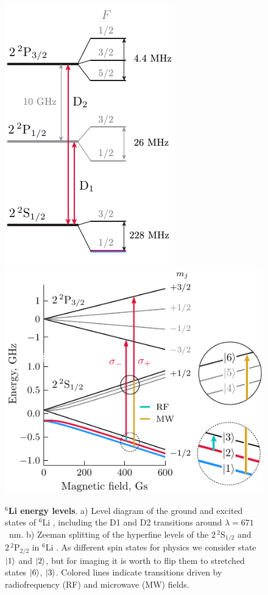 
\begin{figure}[htb]
    \centering
    \includegraphics{fig-ai/li-levels-base.pdf}
    \hspace{1cm}
    \includegraphics{fig-ai/li6-zeeman-broken-ai.pdf}
    \caption{
        \textbf{${}^6$Li energy levels}. 
        a) Level diagram of the ground and excited states of ${}^6$Li \cite{gehm_preparation_2003}, including the D1 and D2 transitions around $\lambda = 671$~nm. 
        b) Zeeman splitting of the hyperfine levels of the $2\, {}^2\mathrm{S}_{1/2}$ and $2\, {}^2\mathrm{P}_{2/2}$ in ${}^6$Li \cite{serwane_deterministic_2011, sibalic_arc_2017}. As different spin states for physics we consider state $\left| 1 \right\rangle$ and $\left| 2 \right\rangle$, but for imaging it is worth to flip them to stretched states $\left| 6 \right\rangle$, $\left| 3 \right\rangle$. Colored lines indicate transitions driven by radiofrequency (RF) and microwave (MW) fields.
    }
    \label{fig:li6levels}
\end{figure}
